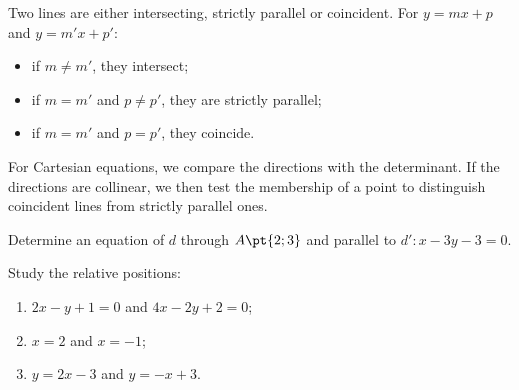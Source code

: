 \begin{keypoint}[Properties]
Two lines are either intersecting, strictly parallel or coincident. For $y=mx+p$ and $y=m'x+p'$:
\begin{itemize}\item if $m\ne m'$, they intersect;\item if $m=m'$ and $p\ne p'$, they are strictly parallel;\item if $m=m'$ and $p=p'$, they coincide.\end{itemize}
For Cartesian equations, we compare the directions with the determinant. If the directions are collinear, we then test the membership of a point to distinguish coincident lines from strictly parallel ones.
\end{keypoint}
\begin{example}Determine an equation of $d$ through $A\pt{2;3}$ and parallel to $d':x-3y-3=0$.\end{example}
\begin{example}Study the relative positions:
\begin{enumerate}\item $2x-y+1=0$ and $4x-2y+2=0$;\item $x=2$ and $x=-1$;\item $y=2x-3$ and $y=-x+3$.\end{enumerate}\end{example}

